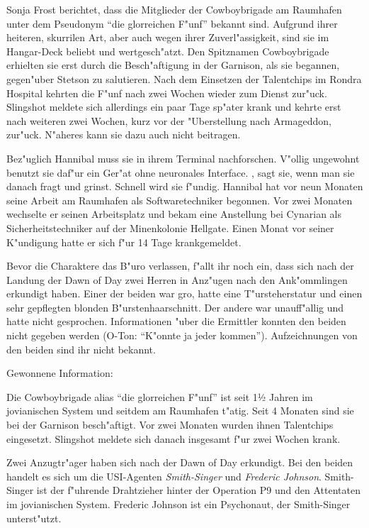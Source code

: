 Sonja Frost berichtet, dass die Mitglieder der Cowboybrigade am Raumhafen unter dem Pseudonym "`die glorreichen F"unf"' bekannt sind. Aufgrund ihrer heiteren, skurrilen Art, aber auch wegen ihrer Zuverl"assigkeit, sind sie im Hangar-Deck beliebt und wertgesch"atzt. Den Spitznamen Cowboybrigade erhielten sie erst durch die Besch"aftigung in der Garnison, als sie begannen, gegen"uber Stetson zu salutieren. Nach dem Einsetzen der Talentchips im Rondra Hospital kehrten die F"unf nach zwei Wochen wieder zum Dienst zur"uck. Slingshot meldete sich allerdings ein paar Tage sp"ater krank und kehrte erst nach weiteren zwei Wochen, kurz vor der "Uberstellung nach Armageddon, zur"uck. N"aheres kann sie dazu auch nicht beitragen.

Bez"uglich Hannibal muss sie in ihrem Terminal nachforschen. V"ollig ungewohnt benutzt sie daf"ur ein Ger"at ohne neuronales Interface. , sagt sie, wenn man sie danach fragt und grinst. Schnell wird sie f"undig. Hannibal hat vor neun Monaten seine Arbeit am Raumhafen als Softwaretechniker begonnen. Vor zwei Monaten wechselte er seinen Arbeitsplatz und bekam eine Anstellung bei Cynarian als Sicherheitstechniker auf der Minenkolonie Hellgate. Einen Monat vor seiner K"undigung hatte er sich f"ur 14 Tage krankgemeldet.

Bevor die Charaktere das B"uro verlassen, f"allt ihr noch ein, dass sich nach der Landung der Dawn of Day zwei Herren in Anz"ugen nach den Ank"ommlingen erkundigt haben. Einer der beiden war gro\3, hatte eine T"ursteherstatur und einen sehr gepflegten blonden B"urstenhaarschnitt. Der andere war unauff"allig und hatte nicht gesprochen. Informationen "uber die Ermittler konnten den beiden nicht gegeben werden (O-Ton: "`K"onnte ja jeder kommen"'). Aufzeichnungen von den beiden sind ihr nicht bekannt.

\begin{remarks}
	Gewonnene Information: 
	
	Die Cowboybrigade alias "`die glorreichen F"unf"' ist seit 1½ Jahren im jovianischen System und seitdem am Raumhafen t"atig. Seit 4 Monaten sind sie bei der Garnison besch"aftigt. Vor zwei Monaten wurden ihnen Talentchips eingesetzt. Slingshot meldete sich danach insgesamt f"ur zwei Wochen krank.
	
	Zwei Anzugtr"ager haben sich nach der Dawn of Day erkundigt. Bei den beiden handelt es sich um die USI-Agenten  \emph{Smith-Singer} und \emph{Frederic Johnson}. Smith-Singer ist der f"uhrende Drahtzieher hinter der Operation P9 und den Attentaten im jovianischen System. Frederic Johnson ist ein Psychonaut, der Smith-Singer unterst"utzt.
\end{remarks}


